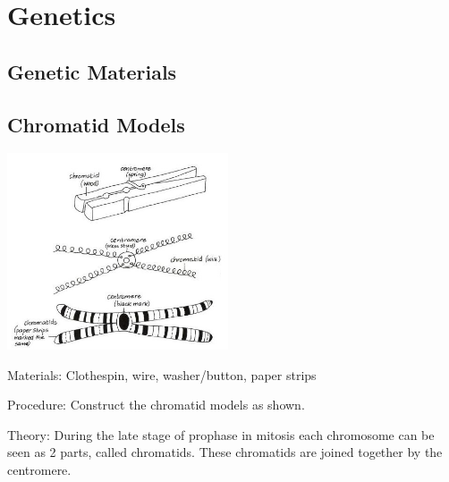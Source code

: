\section{Genetics}  

\begin{multicols}{2}


\section*{Genetic Materials}


\subsection{Chromatid Models} %

\begin{center}
\includegraphics[width=0.49\textwidth]{./img/vso/chromatid.jpg}
\end{center}

\begin{description*}
\item[Materials:]{Clothespin, wire, washer/button, paper strips}
\item[Procedure:]{Construct the chromatid models as shown.}
\item[Theory:]{During the late stage of prophase in mitosis each chromosome can be
seen as 2 parts, called chromatids. These chromatids are joined
together by the centromere.}
\end{description*}


\end{multicols}
